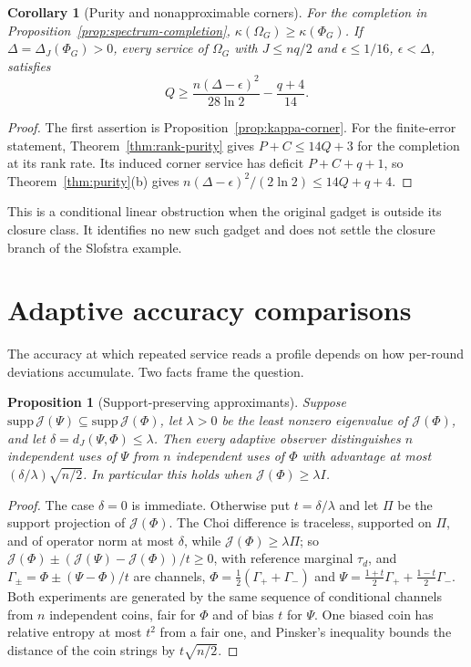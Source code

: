 \documentclass[11pt,a4paper]{article}
\theoremstyle{plain}
\newtheorem{proposition}[theorem]{Proposition}
\newtheorem{corollary}[theorem]{Corollary}
\theoremstyle{definition}
\theoremstyle{remark}
\newcommand{\dJ}{d_J}
\begin{document}
\begin{corollary}[Purity and nonapproximable corners]\label{cor:completion-purity}
For the completion in Proposition~\ref{prop:spectrum-completion}, $\kappa(\Omega_G)\ge\kappa(\Phi_G)$. If
$\Delta=\Delta_J(\Phi_G)>0$, every service of $\Omega_G$ with $J\le nq/2$ and $\epsilon\le1/16$, $\epsilon<\Delta$, satisfies
\[
Q\ge\frac{n(\Delta-\epsilon)^2}{28\ln2}-\frac{q+4}{14}.
\]
\end{corollary}

\begin{proof}
The first assertion is Proposition~\ref{prop:kappa-corner}. For the finite-error statement, Theorem~\ref{thm:rank-purity} gives
$P+C\le14Q+3$ for the completion at its rank rate. Its induced corner service has deficit $P+C+q+1$, so Theorem~\ref{thm:purity}(b) gives
$n(\Delta-\epsilon)^2/(2\ln2)\le14Q+q+4$.
\end{proof}

This is a conditional linear obstruction when the original gadget is outside its closure class. It identifies no new such gadget and
does not settle the closure branch of the Slofstra example.


\section{Adaptive accuracy comparisons}\label{app:accuracy}


The accuracy at which repeated service reads a profile depends on how per-round deviations accumulate. Two facts
frame the question.

\begin{proposition}[Support-preserving approximants]\label{prop:fullrank}
Suppose $\mathrm{supp}\,\mathcal J(\Psi)\subseteq\mathrm{supp}\,\mathcal J(\Phi)$, let $\lambda>0$ be the least nonzero eigenvalue of $\mathcal J(\Phi)$, and let
$\delta=\dJ(\Psi,\Phi)\le\lambda$. Then every adaptive observer distinguishes $n$ independent uses of $\Psi$ from $n$ independent uses of $\Phi$ with
advantage at most $(\delta/\lambda)\sqrt{n/2}$. In particular this holds when $\mathcal J(\Phi)\ge\lambda I$.
\end{proposition}

\begin{proof}
The case $\delta=0$ is immediate. Otherwise put $t=\delta/\lambda$ and let $\Pi$ be the support projection of $\mathcal J(\Phi)$. The Choi difference is traceless, supported on $\Pi$, and of
operator norm at most $\delta$, while $\mathcal J(\Phi)\ge\lambda\Pi$; so $\mathcal J(\Phi)\pm(\mathcal J(\Psi)-\mathcal J(\Phi))/t\ge0$, with reference marginal $\tau_d$, and
$\Gamma_\pm=\Phi\pm(\Psi-\Phi)/t$ are channels, $\Phi=\frac12(\Gamma_++\Gamma_-)$ and $\Psi=\frac{1+t}2\Gamma_++\frac{1-t}2\Gamma_-$. Both
experiments are generated by the same sequence of conditional channels from $n$ independent coins, fair for $\Phi$ and of
bias $t$ for $\Psi$. One biased coin has relative entropy at most $t^2$ from a fair one, and Pinsker's inequality bounds the
distance of the coin strings by $t\sqrt{n/2}$.
\end{proof}
\end{document}
